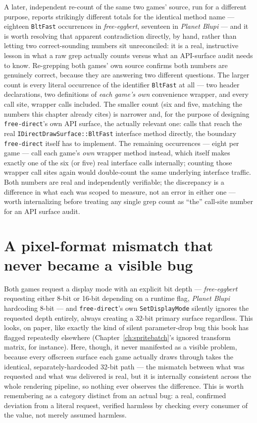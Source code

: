 A later, independent re-count of the same two games' source, run for a different purpose,
reports strikingly different totals for the identical method name --- eighteen
\texttt{BltFast} occurrences in \emph{free-eggbert}, seventeen in \emph{Planet Blupi} --- and
it is worth resolving that apparent contradiction directly, by hand, rather than letting two
correct-sounding numbers sit unreconciled: it is a real, instructive lesson in what a raw
grep actually counts versus what an API-surface audit needs to know. Re-grepping both games'
own source confirms both numbers are genuinely correct, because they are answering two
different questions. The larger count is every literal occurrence of the identifier
\texttt{BltFast} at all --- two header declarations, two definitions of \emph{each game's
own}  convenience wrapper, and every call site, wrapper calls
included. The smaller count (six and five, matching the numbers this chapter already cites)
is narrower and, for the purpose of designing \texttt{free-direct}'s own API surface,
the actually relevant one: calls that reach the real \texttt{IDirectDrawSurface::BltFast}
interface method directly, the boundary \texttt{free-direct} itself has to implement. The
remaining occurrences --- eight per game --- call each game's \emph{own}
 wrapper method instead, which itself makes exactly one of the six
(or five) real interface calls internally; counting those wrapper call sites again would
double-count the same underlying interface traffic. Both numbers are real and independently
verifiable; the discrepancy is a difference in what each was scoped to measure, not an error
in either one --- worth internalizing before treating any single grep count as ``the'' call-site
number for an API surface audit.

\section{A pixel-format mismatch that never became a visible bug}
\label{sec:blupi-pixel-format-mismatch}

Both games request a display mode with an explicit bit depth --- \emph{free-eggbert}
requesting either 8-bit or 16-bit depending on a runtime flag, \emph{Planet Blupi} hardcoding
8-bit --- and \texttt{free-direct}'s own \texttt{SetDisplayMode} silently ignores the
requested depth entirely, always creating a 32-bit primary surface regardless. This looks, on
paper, like exactly the kind of silent parameter-drop bug this book has flagged repeatedly
elsewhere (Chapter~\ref{ch:spritebatch}'s ignored transform matrix, for instance). Here,
though, it never manifested as a visible problem, because every offscreen surface each game
actually draws through takes the identical, separately-hardcoded 32-bit path --- the mismatch
between what was requested and what was delivered is real, but it is internally consistent
across the whole rendering pipeline, so nothing ever observes the difference. This is worth
remembering as a category distinct from an actual bug: a real, confirmed deviation from a
literal request, verified harmless by checking every consumer of the value, not merely
assumed harmless.

